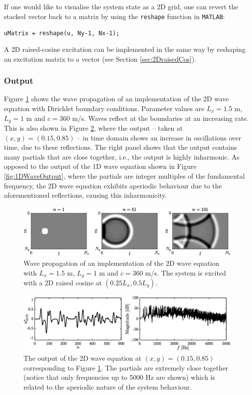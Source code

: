 If one would like to visualise the system state as a 2D grid, one can revert the stacked vector back to a matrix by using the \texttt{reshape} function in \texttt{MATLAB}:
\begin{center}
    \texttt{uMatrix = reshape(u, Ny-1, Nx-1);}
\end{center}
A 2D raised-cosine excitation can be implemented in the same way by reshaping an excitation matrix to a vector (see Section \ref{sec:2DraisedCos}).

\subsubsection{Output}
Figure \ref{fig:2Dpropagation} shows the wave propagation of an implementation of the 2D wave equation with Dirichlet boundary conditions. Parameter values are $L_x = 1.5$ m, $L_y = 1$ m and $c= 360$ m/s. Waves reflect at the boundaries at an increasing rate. This is also shown in Figure \ref{fig:output2DWave}, where the output -- taken at $(x,y) = (0.15, 0.85)$ -- in time domain shows an increase in oscillations over time, due to these reflections. The right panel shows that the output contains many partials that are close together, i.e., the output is highly inharmonic. As opposed to the output of the 1D wave equation shown in Figure \ref{fig:1DWaveOutput}, where the partials are integer multiples of the fundamental frequency, the 2D wave equation exhibits aperiodic behaviour due to the aforementioned reflections, causing this inharmonicity.

\begin{figure}[h]
    \centering
    \includegraphics[width=\textwidth]{figures/resonators/2d/twoDPropagation.eps}
    \caption{Wave propagation of an implementation of the 2D wave equation with $L_x = 1.5$ m, $L_y = 1$ m and $c= 360$ m/s. The system is excited with a 2D raised cosine at $(0.25L_x, 0.5L_y)$.\label{fig:2Dpropagation}}
\end{figure}

\begin{figure}[h]
    \centering
    \includegraphics[width=\textwidth]{figures/resonators/2d/output2Dwave.eps}
    \caption{The output of the 2D wave equation at $(x,y) = (0.15, 0.85)$ corresponding to Figure \ref{fig:2Dpropagation}. The partials are extremely close together (notice that only frequencies up to 5000 Hz are shown) which is related to the aperiodic nature of the system behaviour. \label{fig:output2DWave}}
\end{figure}

